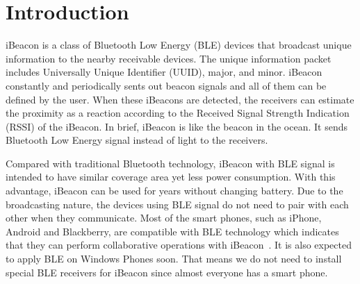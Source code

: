\documentclass[12pt]{report}
\begin{document}
\tableofcontents


\listoffigures

\listoftables



\clearpage



\setcounter{page}{1}

% 
%
\chapter{Introduction}
iBeacon is a class of Bluetooth Low Energy (BLE) devices that broadcast unique information to the nearby receivable devices. The unique information packet includes Universally Unique Identifier (UUID), major, and minor. iBeacon constantly and periodically sents out beacon signals and all of them can be defined by the user. When these iBeacons are detected, the receivers can estimate the proximity as a reaction according to the Received Signal Strength Indication (RSSI) of the iBeacon. In brief, iBeacon is like the beacon in the ocean. It sends Bluetooth Low Energy signal instead of light to the receivers. 

Compared with traditional Bluetooth technology, iBeacon with BLE signal is intended to have similar coverage area yet less power consumption. With this advantage, iBeacon can be used for years without changing battery. Due to the broadcasting nature, the devices using BLE signal do not need to pair with each other when they communicate. Most of the smart phones, such as iPhone, Android and Blackberry, are compatible with BLE technology which indicates that they can perform collaborative operations with iBeacon~\cite{ens}. It is also expected to apply BLE on Windows Phones soon. That means we do not need to install special BLE receivers for iBeacon since almost everyone has a smart phone.
\end{document}
